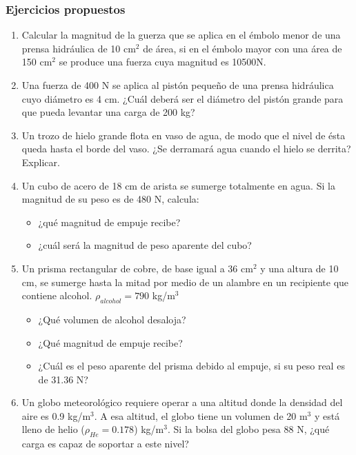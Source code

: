 \documentclass[handout]{beamer}
\begin{document}
\begin{frame}[allowframebreaks,t]
\frametitle{Ejercicios propuestos}
\begin{enumerate}
\item Calcular la magnitud de la guerza que se aplica en el émbolo menor de una prensa
  hidráulica de 10 cm$^2$ de área, si en el émbolo mayor con una área de 150 cm$^2$ se
  produce una fuerza  cuya magnitud es 10500N. 
\item Una fuerza de 400 N se aplica al pistón pequeño de una prensa hidráulica cuyo
  diámetro es 4 cm. ¿Cuál deberá ser el diámetro del pistón grande para que pueda levantar
  una carga de 200 kg?

\item Un trozo de hielo grande flota en vaso de agua, de modo que el nivel de ésta queda
  hasta el borde del vaso. ¿Se derramará agua cuando el hielo se derrita? Explicar.

\item Un cubo de acero de 18 cm de arista se sumerge totalmente en agua. Si la magnitud
  de su peso es de 480 N, calcula:
  \begin{itemize}
  \item ¿qué magnitud de empuje recibe?
  \item ¿cuál será la magnitud de peso aparente del cubo?
  \end{itemize}
  
\item Un prisma rectangular de cobre, de base igual a 36 cm$^2$ y una altura de 10 cm, se
  sumerge hasta la mitad por medio de un alambre en un recipiente que contiene
  alcohol. $\rho_{alcohol} = 790 $ kg/m$^3$
  \begin{itemize}
  \item ¿Qué volumen de alcohol desaloja?
  \item ¿Qué magnitud de empuje recibe?
  \item ¿Cuál es el peso aparente del prisma debido al empuje, si su peso real es de 31.36
    N?
  \end{itemize}

\item Un globo meteorológico requiere operar a una altitud donde la densidad del aire es
  0.9 kg/m$^3$. A esa altitud, el globo tiene un volumen de 20 m$^3$ y está lleno de helio
  ($\rho_{He} = 0.178$) kg/m$^3$. Si la bolsa del globo pesa 88 N, ¿qué carga es capaz de
  soportar a este nivel?
\end{enumerate}
\end{frame}
\end{document}
